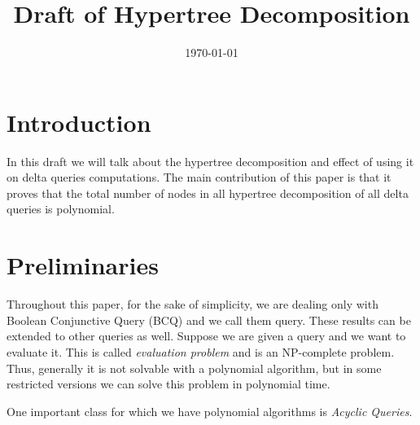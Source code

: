 \documentclass[12pt]{article}
\begin{document}
\title{Draft of Hypertree Decomposition}
\date{\today}
\maketitle
\section{Introduction}
In this draft we will talk about the hypertree decomposition and effect of using it on delta queries computations. The main contribution of this paper is that it proves that the total number of nodes in all hypertree decomposition of all delta queries is polynomial.
\section{Preliminaries}
Throughout this paper, for the sake of simplicity, we are dealing only with Boolean Conjunctive Query (BCQ) and we call them query. These results can be extended to other queries as well. Suppose we are given a query and we want to evaluate it. This is called \emph{evaluation problem} and is an NP-complete problem\cite{1}. Thus, generally it is not solvable with a polynomial algorithm, but in some restricted versions we can solve this problem in polynomial time. \par

One important class for which we have polynomial algorithms is \emph{Acyclic Queries}. 
\end{document}
